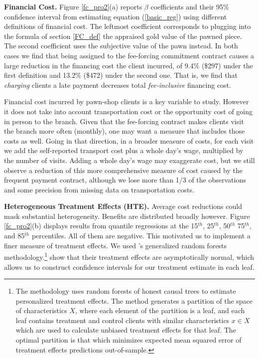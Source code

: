 \documentclass[oneside,11pt]{article}
\begin{document}
\vspace{.2in}
\noindent \textbf{Financial Cost.} Figure \ref{fc_pro2}(a) reports $\beta$ coefficients and their 95\% confidence interval from estimating equation (\ref{basic_reg}) using different definitions of financial cost. The leftmost coefficient corresponds to plugging into the formula of section \ref{FC_def} the appraised gold value of the pawned piece. The second coefficient uses the subjective value of the pawn instead. In both cases we find that being assigned to the fee-forcing commitment contract causes a large reduction in the financing cost the client incurred, of 9.4\% (\$297) under the first definition and 13.2\% (\$472) under the second one. That is, we find that \textit{charging} clients a late payment decreases total \textit{fee-inclusive} financing cost. 

Financial cost incurred by pawn-shop clients is a key variable to study. However it does not take into account transportation cost or the opportunity cost of going in person to the branch. Given that the fee-forcing contract makes clients visit the branch more often (monthly), one may want a measure that includes those costs as well. Going in that direction, in a broader measure of costs, for each visit we add the self-reported transport cost plus a whole day's wage, multiplied by the number of visits. Adding a whole day's wage may exaggerate cost, but we still observe a reduction of this more comprehensive measure of cost caused by the frequent payment contract, although we lose more than 1/3 of the observations and some precision from missing data on transportation costs. 

\vspace{.2in}
\noindent \textbf{Heterogeneous Treatment Effects (HTE).} Average cost reductions could mask substantial heterogeneity. Benefits are distributed broadly however. Figure \ref{fc_pro2}(b) displays results from quantile regressions at the 15$^{th}$, 25$^{th}$, 50$^{th}$ 75$^{th}$, and 85$^{th}$ percentiles. All of them are negative. This motivated us to implement a finer measure of treatment effects. We used  \cite{atheygrf}'s generalized random forests methodology.\footnote{The methodology uses random forests of honest causal trees to estimate personalized treatment effects. The method generates a partition of the space of characteristics $X$, where each element of the partition is a leaf, and each leaf contains treatment and control clients with similar characteristics $x \in X$ which are used to calculate unbiased treatment effects for that leaf. The optimal partition is that which minimizes expected mean squared error of treatment effects predictions out-of-sample.} %
\cite{atheygrf} show that their treatment effects are asymptotically normal, which allows us to construct confidence intervals for our treatment estimate in each leaf. 
\end{document}
